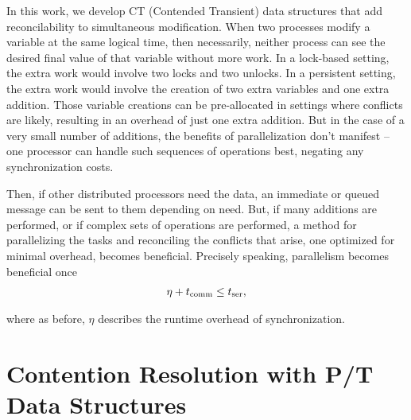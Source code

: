 In this work, we develop CT (Contended Transient) data structures that add
reconcilability to simultaneous modification. When two processes modify a
variable at the same logical time, then necessarily, neither process can see the
desired final value of that variable without more work. In a lock-based setting,
the extra work would involve two locks and two unlocks. In a persistent setting,
the extra work would involve the creation of two extra variables and one extra
addition. Those variable creations can be pre-allocated in settings where
conflicts are likely, resulting in an overhead of just one extra addition. But
in the case of a very small number of additions, the benefits of parallelization
don't manifest -- one processor can handle such sequences of operations best,
negating any synchronization costs.

Then, if other distributed processors need the data, an immediate or queued
message can be sent to them depending on need.  But, if many additions are
performed, or if complex sets of operations are performed, a method for
parallelizing the tasks and reconciling the conflicts that arise, one optimized
for minimal overhead, becomes beneficial. Precisely speaking, parallelism
becomes beneficial once
\begin{align*}
    \eta + t_\mathrm{comm} \leq t_\mathrm{ser} \text{,}
\end{align*}

where as before, $\eta$ describes the runtime overhead of synchronization.

\section{Contention Resolution with P/T Data Structures}

